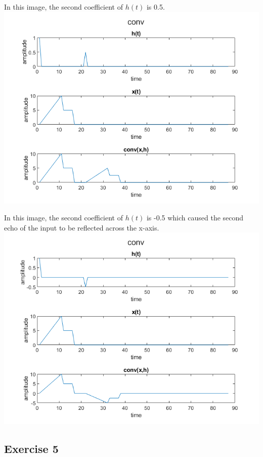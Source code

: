 \documentclass[11pt]{article}
\begin{document}


In this image, the second coefficient of $h(t)$ is 0.5.\\

\includegraphics[scale=0.7]{convolution.png}

In this image, the second coefficient of $h(t)$ is -0.5 which caused the second echo of the input to be reflected across the x-axis.\\

\includegraphics[scale=0.7]{neg_convolution.png}

\subsection{Exercise 5}
\end{document}
